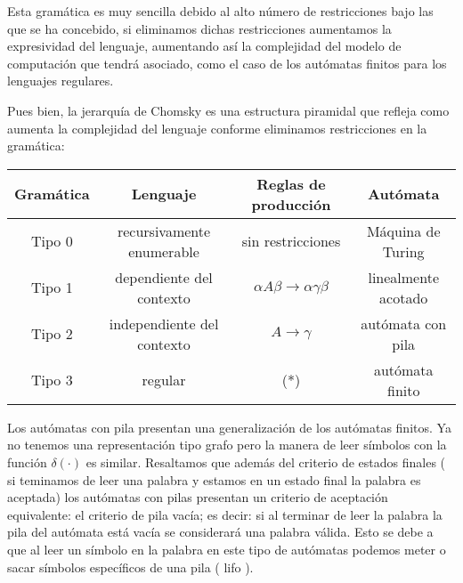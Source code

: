 Esta gramática es muy sencilla debido al alto número de restricciones bajo las que se ha concebido, si eliminamos dichas restricciones aumentamos la expresividad del lenguaje, aumentando así la complejidad del modelo de computación que tendrá asociado, como el caso de los autómatas finitos para los lenguajes regulares.

\vspace{10px}

Pues bien, la jerarquía de Chomsky es una estructura piramidal que refleja como aumenta la complejidad del lenguaje conforme eliminamos restricciones en la gramática:

\vspace{1cm}


\begin{center}
	\begin{tabular}{|c|c|c|c|}
		\hline 
		Gramática & Lenguaje  &Reglas de producción   & Autómata  \\ 
		\hline 
		Tipo 0	& recursivamente enumerable  & sin restricciones  & Máquina de Turing  \\ 
		\hline 
		Tipo 1	& dependiente del contexto  & $\alpha A \beta \rightarrow \alpha \gamma \beta$ & linealmente acotado  \\ 
		\hline 
		Tipo 2	& independiente del contexto  & $A \rightarrow \gamma $  & autómata con pila   \\ 
		\hline 
		Tipo 3	& regular  & (*) & autómata finito \\
		\hline 
	\end{tabular} 
\end{center}

\vspace{1cm}

Los autómatas con pila presentan una generalización de los autómatas finitos. Ya no tenemos una representación tipo grafo pero la manera de leer símbolos con la función $\delta(\cdot)$ es similar. Resaltamos que además del criterio de estados finales ( si teminamos de leer una palabra y estamos en un estado final la palabra es aceptada) los autómatas con pilas presentan un criterio de aceptación equivalente: el criterio de pila vacía; es decir: si al terminar de leer la palabra la pila del autómata está vacía se considerará una palabra válida. Esto se debe a que al leer un símbolo en la palabra en este tipo de autómatas podemos meter o sacar símbolos específicos de una pila ( lifo ).

\vspace{10px}

